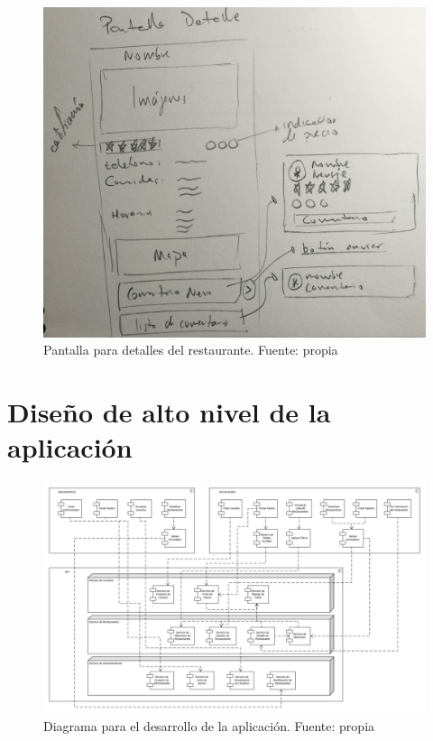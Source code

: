 \documentclass[12pt,letterpaper]{article}
\begin{document}
\begin{figure}[h!]
	\begin{center}
		\includegraphics[scale=0.09]{pantalla_detalle.jpg}
		\caption{Pantalla para detalles del restaurante. Fuente: propia}
		\label{img:pantalla_detalles}
	\end{center}
\end{figure}

\section{Diseño de alto nivel de la aplicación}

\begin{figure}[h!]
	\begin{center}
		\includegraphics[scale=0.35]{diagrama_alto_nivel.jpeg}
		\caption{Diagrama para el desarrollo de la aplicación. Fuente: propia}
		\label{img:diagrama}
	\end{center}
\end{figure}
\end{document}
